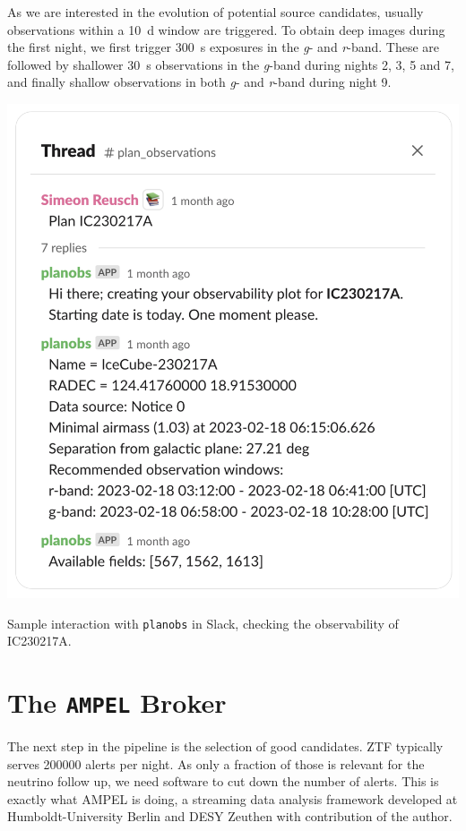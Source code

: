 \documentclass[
    a4paper, %
    fontsize=10pt, %
    twoside=true, %
    numbers=noenddot, %
    fontmethod=tex,
]{kaobook}
\begin{document}
As we are interested in the evolution of potential source candidates, usually observations within a \SI{10}{\day} window are triggered. To obtain deep images during the first night, we first trigger \SI{300}{\second} exposures in the \textit{g}- and \textit{r}-band. These are followed by shallower \SI{30}{\second} observations in the \textit{g}-band during nights 2, 3, 5 and 7, and finally shallow observations in both \textit{g}- and \textit{r}-band during night 9.
\begin{marginfigure}
    \includegraphics{fu/planobs_slack_border.pdf}
    \caption[\texttt{planobs} Slack interaction]{Sample interaction with \texttt{planobs} in Slack, checking the observability of IC230217A.}
\end{marginfigure} 
\section{The \texttt{AMPEL} Broker} \label{ampel}
The next step in the pipeline is the selection of good candidates. ZTF typically serves 200000 alerts per night. As only a fraction of those is relevant for the neutrino follow up, we need software to cut down the number of alerts. This is exactly what AMPEL is doing, a streaming data analysis framework developed at Humboldt-University Berlin and DESY Zeuthen with contribution of the author.
\end{document}
